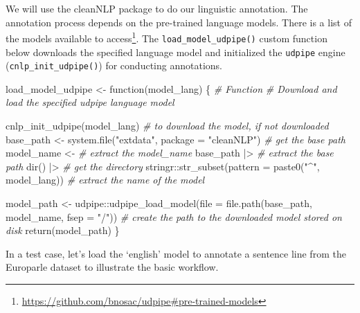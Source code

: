 \documentclass[
  letterpaper,
]{scrbook}
\newenvironment{Shaded}{\begin{snugshade}}{\end{snugshade}}
\newcommand{\AttributeTok}[1]{\textcolor[rgb]{0.00,0.00,0.00}{#1}}
\newcommand{\CommentTok}[1]{\textcolor[rgb]{0.00,0.00,0.00}{\textit{#1}}}
\newcommand{\ControlFlowTok}[1]{\textcolor[rgb]{0.00,0.00,0.00}{#1}}
\newcommand{\FunctionTok}[1]{\textcolor[rgb]{0.00,0.00,0.00}{#1}}
\newcommand{\NormalTok}[1]{\textcolor[rgb]{0.00,0.00,0.00}{#1}}
\newcommand{\OtherTok}[1]{\textcolor[rgb]{0.00,0.00,0.00}{#1}}
\newcommand{\SpecialCharTok}[1]{\textcolor[rgb]{0.00,0.00,0.00}{#1}}
\newcommand{\StringTok}[1]{\textcolor[rgb]{0.00,0.00,0.00}{#1}}
\DeclareRobustCommand{\href}[2]{#2\footnote{\url{#1}}}
\begin{document}
We will use the cleanNLP package to do our linguistic annotation. The
annotation process depends on the pre-trained language models. There is
\href{https://github.com/bnosac/udpipe\#pre-trained-models}{a list of
the models available to access}. The \texttt{load\_model\_udpipe()}
custom function below downloads the specified language model and
initialized the \texttt{udpipe} engine (\texttt{cnlp\_init\_udpipe()})
for conducting annotations.

\begin{Shaded}
\begin{Highlighting}[]
\NormalTok{load\_model\_udpipe }\OtherTok{\textless{}{-}} \ControlFlowTok{function}\NormalTok{(model\_lang) \{}
  \CommentTok{\# Function}
  \CommentTok{\# Download and load the specified udpipe language model}
  
  \FunctionTok{cnlp\_init\_udpipe}\NormalTok{(model\_lang) }\CommentTok{\# to download the model, if not downloaded}
\NormalTok{base\_path }\OtherTok{\textless{}{-}} \FunctionTok{system.file}\NormalTok{(}\StringTok{"extdata"}\NormalTok{, }\AttributeTok{package =} \StringTok{"cleanNLP"}\NormalTok{) }\CommentTok{\# get the base path}
\NormalTok{  model\_name }\OtherTok{\textless{}{-}} \CommentTok{\# extract the model\_name}
\NormalTok{    base\_path }\SpecialCharTok{|\textgreater{}} \CommentTok{\# extract the base path}
    \FunctionTok{dir}\NormalTok{() }\SpecialCharTok{|\textgreater{}} \CommentTok{\# get the directory}
\NormalTok{    stringr}\SpecialCharTok{::}\FunctionTok{str\_subset}\NormalTok{(}\AttributeTok{pattern =} \FunctionTok{paste0}\NormalTok{(}\StringTok{"\^{}"}\NormalTok{, model\_lang)) }\CommentTok{\# extract the name of the model}
  
\NormalTok{  model\_path }\OtherTok{\textless{}{-}}\NormalTok{ udpipe}\SpecialCharTok{::}\FunctionTok{udpipe\_load\_model}\NormalTok{(}\AttributeTok{file =} \FunctionTok{file.path}\NormalTok{(base\_path, model\_name, }\AttributeTok{fsep =} \StringTok{"/"}\NormalTok{)) }\CommentTok{\# create the path to the downloaded model stored on disk}
    \FunctionTok{return}\NormalTok{(model\_path)}
\NormalTok{\}}
\end{Highlighting}
\end{Shaded}

In a test case, let's load the `english' model to annotate a sentence
line from the Europarle dataset to illustrate the basic workflow.
\end{document}
